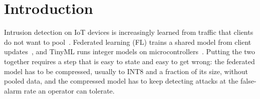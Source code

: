 \documentclass[sigplan,10pt,review,anonymous,nonacm]{acmart}
\begin{document}
\maketitle

\section{Introduction}
Intrusion detection on IoT devices is increasingly learned from traffic that clients do not want to
pool~\cite{atzori2010iot}. Federated learning (FL) trains a shared model from client
updates~\cite{mcmahan2017communication,konecny2016federated}, and TinyML runs integer models on
microcontrollers~\cite{banbury2020benchmarking,david2021tflm}. Putting the two together requires a
step that is easy to state and easy to get wrong: the federated model has to be compressed, usually
to INT8 and a fraction of its size, without pooled data, and the compressed model has to keep
detecting attacks at the false-alarm rate an operator can tolerate.
\end{document}
